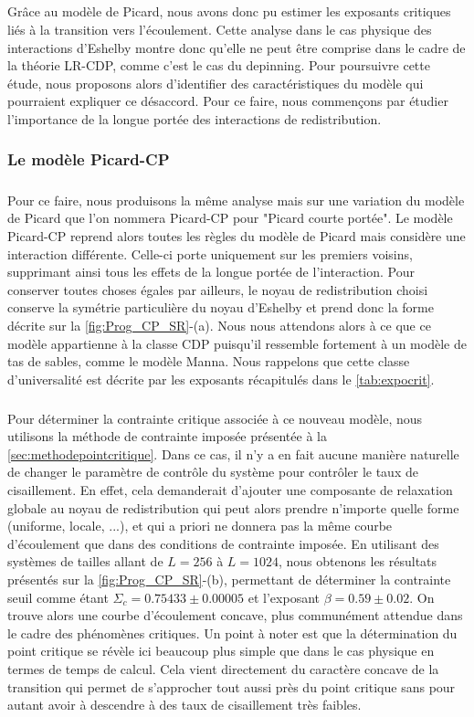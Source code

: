 \subparagraph{}Grâce au modèle de Picard, nous avons donc pu estimer les exposants critiques liés à la transition vers l'écoulement. Cette analyse dans le cas physique des interactions d'Eshelby montre donc qu'elle ne peut être comprise dans le cadre de la théorie LR-CDP, comme c'est le cas du depinning. Pour poursuivre cette étude, nous proposons alors d'identifier des caractéristiques du modèle qui pourraient expliquer ce désaccord. Pour ce faire, nous commençons par étudier l'importance de la longue portée des interactions de redistribution.

\subsubsection{Le modèle Picard-CP}

\subparagraph{} Pour ce faire, nous produisons la même analyse mais sur une variation du modèle de Picard que l'on nommera Picard-CP pour "Picard courte portée". Le modèle Picard-CP reprend alors toutes les règles du modèle de Picard mais considère une interaction différente. Celle-ci porte uniquement sur les premiers voisins, supprimant ainsi tous les effets de la longue portée de l'interaction. Pour conserver toutes choses égales par ailleurs, le noyau de redistribution choisi conserve la symétrie particulière du noyau d'Eshelby et prend donc la forme décrite sur la \autoref{fig:Prog_CP_SR}-(a). Nous nous attendons alors à ce que ce modèle appartienne à la classe CDP puisqu'il ressemble fortement à un modèle de tas de sables, comme le modèle Manna. Nous rappelons que cette classe d'universalité est décrite par les exposants récapitulés dans le \autoref{tab:expocrit}.

\subparagraph{}Pour déterminer la contrainte critique associée à ce nouveau modèle, nous utilisons la méthode de contrainte imposée présentée à la \autoref{sec:methodepointcritique}. Dans ce cas, il n'y a en fait aucune manière naturelle de changer le paramètre de contrôle du système pour contrôler le taux de cisaillement. En effet, cela demanderait d'ajouter une composante de relaxation globale au noyau de redistribution qui peut alors prendre n'importe quelle forme (uniforme, locale, ...), et qui a priori ne donnera pas la même courbe d'écoulement que dans des conditions de contrainte imposée. En utilisant des systèmes de tailles allant de $L=256$ à $L=1024$, nous obtenons les résultats présentés sur la \autoref{fig:Prog_CP_SR}-(b), permettant de déterminer la contrainte seuil comme étant $\Sigma_c = 0.75433 \pm 0.00005$ et l'exposant $\beta = 0.59 \pm 0.02$. On trouve alors une courbe d'écoulement concave, plus communément attendue dans le cadre des phénomènes critiques. Un point à noter est que la détermination du point critique se révèle ici beaucoup plus simple que dans le cas physique en termes de temps de calcul. Cela vient directement du caractère concave de la transition qui permet de s'approcher tout aussi près du point critique sans pour autant avoir à descendre à des taux de cisaillement très faibles.


